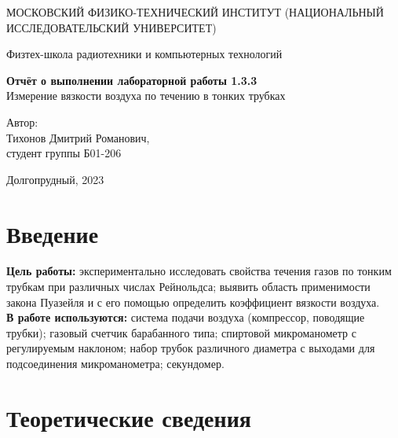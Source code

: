 \documentclass[a4paper, 12pt]{article}
\begin{document}
    \begin{titlepage}
	\begin{center}
            {\large МОСКОВСКИЙ ФИЗИКО-ТЕХНИЧЕСКИЙ ИНСТИТУТ (НАЦИОНАЛЬНЫЙ       ИССЛЕДОВАТЕЛЬСКИЙ УНИВЕРСИТЕТ)}
	\end{center}
 
	\begin{center}
		{\large Физтех-школа радиотехники и компьютерных технологий}
	\end{center}
	
	\vspace{8cm}
	{\LARGE
		\begin{center}
                {\bf Отчёт о выполнении лабораторной работы 1.3.3}\\
                Измерение вязкости воздуха по течению в тонких трубках
		\end{center}
	}
	\vspace{5cm}
	\begin{flushright}
		{\Large Автор:\\ Тихонов Дмитрий Романович, \\
			\vspace{0.2cm}
			студент группы Б01-206}
	\end{flushright}
	\vspace{5cm}
	\begin{center}
		\Large Долгопрудный, 2023
	\end{center}
    \end{titlepage}

    \section*{Введение}

    \noindent \textbf{Цель работы:} экспериментально исследовать свойства течения газов по тонким трубкам при различных числах Рейнольдса; выявить область применимости закона Пуазейля и с его помощью определить коэффициент вязкости воздуха. \\

    \noindent \textbf{В работе используются:} система подачи воздуха (компрессор, поводящие трубки); газовый счетчик барабанного типа; спиртовой микроманометр с регулируемым наклоном; набор трубок различного диаметра с выходами для подсоединения микроманометра; секундомер.
    
    \section*{Теоретические сведения}
\end{document}

